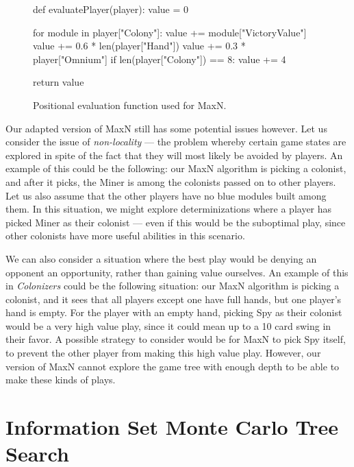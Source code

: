 \begin{figure}[hb]
\begin{code}[commandchars=\\\{\},codes={\catcode`\$=3\catcode`\^=7\catcode`\_=8}]
def evaluatePlayer(player):
    value = 0

    for module in player["Colony"]:
        value += module["VictoryValue"]
    value += 0.6 * len(player["Hand"])
    value += 0.3 * player["Omnium"]
    if len(player["Colony"]) == 8:
        value += 4

    return value
\end{code}
\caption{Positional evaluation function used for MaxN.}\label{algo:maxneval}
\end{figure}

Our adapted version of MaxN still has some potential issues however.
Let us consider the issue of \emph{non-locality} --- the problem whereby
certain game states are explored in spite of the fact that they will
most likely be avoided by players. An example of this could be the following:
our MaxN algorithm is picking a colonist, and after it picks, the Miner is among
the colonists passed on to other players. Let us also assume that the other players
have no blue modules built among them. In this situation,
we might explore determinizations where a player has picked Miner as their colonist
--- even if this would be the suboptimal play, since other colonists
have more useful abilities in this scenario.

We can also consider a situation where the best play would be denying an opponent
an opportunity, rather than gaining value ourselves. An example of this in
\emph{Colonizers} could be the following situation: our MaxN algorithm is picking
a colonist, and it sees that all players except one have full hands, but one
player's hand is empty. For the player with an empty hand, picking Spy as their
colonist would be a very high value play, since it could mean up to a 10 card swing
in their favor. A possible strategy to consider would be for MaxN to pick Spy itself,
to prevent the other player from making this high value play. However, our version
of MaxN cannot explore the game tree with enough depth to be able to make these
kinds of plays.

\section{Information Set Monte Carlo Tree Search}
\label{sec:algoismcts}

